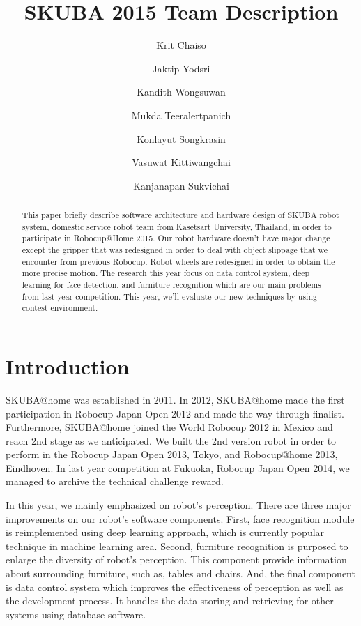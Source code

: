 \documentclass{llncs}
\begin{document}
\title{SKUBA 2015 Team Description}
\author{Krit Chaiso
\and Jaktip Yodsri
\and Kandith Wongsuwan
\and Mukda Teeralertpanich
\and Konlayut Songkrasin
\and Vasuwat Kittiwangchai
\and Kanjanapan Sukvichai
}


\maketitle

\begin{abstract}
This paper briefly describe software architecture and hardware design of SKUBA robot system, domestic service robot team from Kasetsart University, Thailand, in order to participate in Robocup@Home 2015. Our robot hardware doesn't have major change except the gripper that was redesigned in order to deal with object slippage that we encounter from previous Robocup. Robot wheels are redesigned in order to obtain the more precise motion. The research this year focus on data control system, deep learning for face detection, and furniture recognition which are our main problems from last year competition. This year, we'll evaluate our new techniques by using contest environment.
\end{abstract}

\section{Introduction}

SKUBA@home was established in 2011. In 2012, SKUBA@home made the first participation in Robocup Japan Open 2012 and made the way through finalist. Furthermore, SKUBA@home joined the World Robocup 2012 in Mexico and reach 2nd stage as we anticipated. We built the 2nd version robot in order to perform in the Robocup Japan Open 2013, Tokyo, and Robocup@home 2013, Eindhoven. In last year competition at Fukuoka, Robocup Japan Open 2014, we managed to archive the technical challenge reward.

In this year, we mainly emphasized on robot's perception. There are three major improvements on our robot's software components. First, face recognition module is reimplemented using deep learning approach, which is currently popular technique in machine learning area. Second, furniture recognition is purposed to enlarge the diversity of robot's perception. This component provide information about surrounding furniture, such as, tables and chairs. And, the final component is data control system which improves the effectiveness of perception as well as the development process. It handles the data storing and retrieving for other systems using database software.
\end{document}
